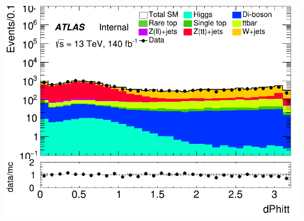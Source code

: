 \documentclass[usenames,dvipsnames]{beamer}
\begin{document}
\begin{frame}
\begin{minipage}{0.32\textwidth}
        \includegraphics[width=\textwidth]{graphics/HH_met/HH_met_dPhitt.png}
    \end{minipage}
\end{frame}
\end{document}
